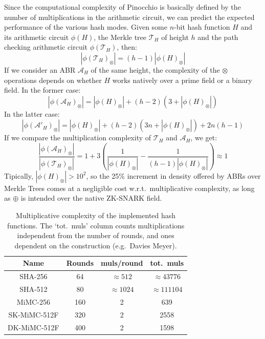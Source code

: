 \noindent Since the computational complexity of Pinocchio is basically defined by the number of
multiplications in the arithmetic circuit, we can predict the expected performance of the various
hash modes.
Given some \(n\)-bit hash function \(H\) and its arithmetic circuit \(\phi\left(H\right)\), the
Merkle tree \(\mathcal{T}_H\) of height \(h\) and the path checking arithmetic circuit
\(\phi\left(\mathcal{T}_H\right)\), then:
\[
	\left|{\phi\left(\mathcal{T}_H\right)}_\otimes\right| =
	\left(h-1\right)\left|{\phi\left(H\right)}_\otimes\right|
\]
If we consider an ABR \(\mathcal{A}_H\) of the same height, the complexity of the \(\otimes \)
operations depends on whether \(H\) works natively over a prime field or a binary field.
In the former case:
\[
	\left|{\phi\left(\mathcal{A}_H\right)}_\otimes\right| = \left|{\phi\left(H\right)}_\otimes\right|
	+ \left(h-2\right)\left(3 + \left|{\phi\left(H\right)}_\otimes\right|\right)
\]
In the latter case:
\[
	\left|{\phi\left(\mathcal{A}'_H\right)}_\otimes\right| = \left|{\phi\left(H\right)}_\otimes\right|
	+ \left(h-2\right)\left(3n + \left|{\phi\left(H\right)}_\otimes\right|\right) + 2n\left(h-1\right)
\]
If we compare the multiplication complexity of \(\mathcal{T}_H\) and \(\mathcal{A}_H\), we get:
\[
	\frac{\left|{\phi\left(\mathcal{A}_H\right)}_\otimes\right|}
	{\left|{\phi\left(\mathcal{T}_H\right)}_\otimes\right|} =
	1 + 3\left(\frac{1}{\left|{\phi\left(H\right)}_\otimes\right|} -
	\frac{1}{\left(h-1\right)\left|{\phi\left(H\right)}_\otimes\right|}\right) \approx 1
\]
Tipically, \(\left|{\phi\left(H\right)}_\otimes\right| > 10^2\), so the 25\% increment in
density offered by ABRs over Merkle Trees comes at a negligible cost w.r.t.\ multiplicative
complexity, as long as \(\oplus \) is intended over the native ZK-SNARK field.
\begin{table}
	\centering
	\begin{tabular}{cccc}
		\toprule
		Name         & Rounds & muls/round       & tot.\ muls         \\
		\midrule
		SHA-256      & 64     & \(\approx 512\)  & \(\approx 43776\)  \\
		SHA-512      & 80     & \(\approx 1024\) & \(\approx 111104\) \\
		MiMC-256     & 160    & 2                & 639                \\
		SK-MiMC-512F & 320    & 2                & 2558               \\
		DK-MiMC-512F & 400    & 2                & 1598               \\
		\bottomrule
	\end{tabular}
	\caption{Multiplicative complexity of the implemented hash functions.
		The `tot.\ muls' column counts multiplications independent from the number of rounds, and
		ones dependent on the construction (e.g.\ Davies Meyer).}\label{tab:hash_mulcomp}
\end{table}
